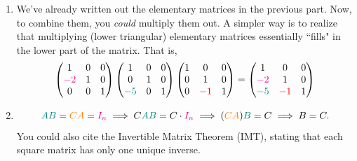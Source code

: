 \begin{enumerate}
		Anyways, moving on
		\begin{equation*}
			\begin{split}
			\small
			\dots &\sim
			\left(\!\!\begin{array}{ccc|ccc}1 & 0 & 1 & 1 & 0 & 0\\ 0 & 1 & 0 & 1 & 2 & -1\\ 0 & 0 & -2 & -3 & -1 & 1\end{array}\!\!\right)
			\sim 
			\left(\!\!\begin{array}{ccc|ccc}1 & 0 & 1 & 1 & 0 & 0\\ 0 & 1 & 0 & 1 & 2 & -1\\ 0 & 0 & -2 & -3 & -1 & 1\end{array}\!\!\right) \\
			&\sim 
			\left(\!\!\begin{array}{ccc|ccc}1 & 0 & 0 & -1/2 & -1/2 & 1/2\\ 0 & 1 & 0 & 1 & 2 & -1\\ 0 & 0 & 1 & 3/2 & 1/2 & -1/2\end{array}\!\!\right) = A^{-1}
			\end{split}
		\end{equation*}
	\item We've already written out the elementary matrices in the previous part. Now, to combine them, you \emph{could} multiply them out. A simpler way is 
		to realize that multiplying (lower triangular) elementary matrices essentially ``fills" in the lower part of the matrix. That is,
		\[\begin{pmatrix}1 & 0 & 0 \\ \color{magenta} -2 & 1 & 0 \\ 0 & 0 & 1\end{pmatrix}
		   \begin{pmatrix}1 & 0 & 0 \\ 0 & 1 & 0 \\ \color{teal} -5 & 0 & 1\end{pmatrix}
		   \begin{pmatrix}1 & 0 & 0 \\ 0 & 1 & 0 \\ 0 & \color{red}-1 & 1 \end{pmatrix} 
		= \begin{pmatrix}1 & 0 & 0 \\ \color{magenta}-2 & 1 & 0 \\ \color{teal} -5 & \color{red}-1 & 1 \end{pmatrix}\]

	\item \[{\color{teal} AB} = {\color{orange} CA} = {\color{magenta} I_n} \implies C{\color{teal} AB} = C \cdot {\color{magenta}I_n}\implies ({\color{orange}CA}){\color{teal}B} =  C \implies B = C.\] 
		You could also cite the Invertible Matrix Theorem (IMT), stating that each square matrix has
		only one unique inverse.
\end{enumerate}

